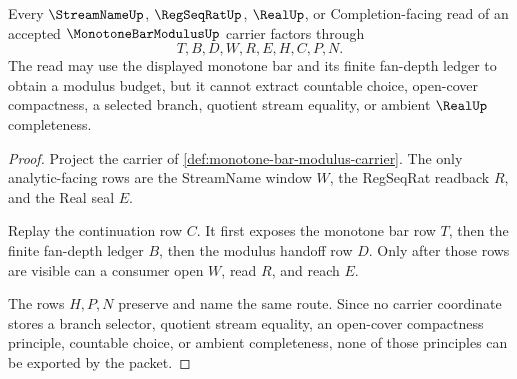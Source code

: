 \begin{theorem}
\label{thm:monotone-bar-modulus-nonescape}
Every $\StreamNameUp$, $\RegSeqRatUp$, $\RealUp$, or Completion-facing read of an accepted $\MonotoneBarModulusUp$ carrier factors through
$$
T,B,D,W,R,E,H,C,P,N.
$$
The read may use the displayed monotone bar and its finite fan-depth ledger to obtain a modulus budget, but it cannot extract countable choice, open-cover compactness, a selected branch, quotient stream equality, or ambient $\RealUp$ completeness.
\end{theorem}
\begin{proof}
Project the carrier of \autoref{def:monotone-bar-modulus-carrier}. The only analytic-facing rows are the StreamName window $W$, the RegSeqRat readback $R$, and the Real seal $E$.

Replay the continuation row $C$. It first exposes the monotone bar row $T$, then the finite fan-depth ledger $B$, then the modulus handoff row $D$. Only after those rows are visible can a consumer open $W$, read $R$, and reach $E$.

The rows $H,P,N$ preserve and name the same route. Since no carrier coordinate stores a branch selector, quotient stream equality, an open-cover compactness principle, countable choice, or ambient completeness, none of those principles can be exported by the packet.
\end{proof}


